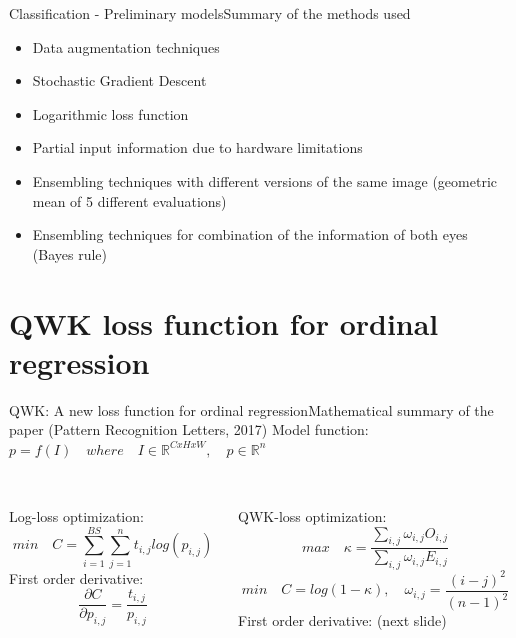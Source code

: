 \documentclass{beamer}
\begin{document}
\begin{frame}{Classification - Preliminary models}{Summary of the methods used}
\begin{itemize}
	\item Data augmentation techniques
	\item Stochastic Gradient Descent
	\item Logarithmic loss function
	\item Partial input information due to hardware limitations
	\item Ensembling techniques with different versions of the same image (geometric mean of 5 different evaluations)
	\item Ensembling techniques for combination of the information of both eyes (Bayes rule)
\end{itemize}	
\end{frame}

\section{QWK loss function for ordinal regression}

\begin{frame}{QWK: A new loss function for ordinal regression}{Mathematical summary of the paper (Pattern Recognition Letters, 2017)}	
Model function: $p = f(I) \quad where \quad I \in \mathbb{R}^{CxHxW}, \quad p \in \mathbb{R}^n$
\begin{columns}
	\begin{column}{0.5\textwidth}
		\\
		\alert{Log-loss optimization:}
		\begin{equation*}
		min \quad C = \sum_{i=1}^{BS} \sum_{j=1}^{n} t_{i,j} log(p_{i,j})
		\end{equation*}			
		First order derivative:\\
		\begin{equation*}
		\frac{\partial C}{\partial p_{i,j}} = \frac{t_{i,j}}{p_{i,j}}
		\end{equation*}							
	\end{column}
	\begin{column}{0.5\textwidth}  %
		\\
		\alert{QWK-loss optimization:}\\
		\begin{equation*}
		max \quad \kappa = \frac{\sum_{i,j} \omega_{i,j}O_{i,j}}{\sum_{i,j} \omega_{i,j} E_{i,j}} 
		\end{equation*}		
		\begin{equation*}
		min \quad C = log(1 - \kappa), \quad \omega_{i,j} = \frac{(i-j)^2}{(n-1)^2}
		\end{equation*}		
		First order derivative: (next slide)			
	\end{column}
\end{columns}	
\end{frame}
\end{document}
